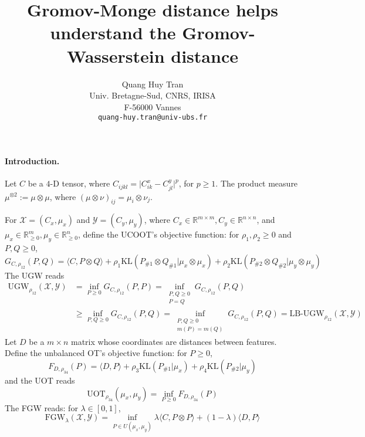 \documentclass{article}
\title{Gromov-Monge distance helps understand the Gromov-Wasserstein distance}
\author{
  Quang Huy Tran \\
  Univ. Bretagne-Sud, CNRS, IRISA \\
  F-56000 Vannes \\
  \texttt{quang-huy.tran@univ-ubs.fr}
}
\theoremstyle{remark}
\begin{document}
\maketitle

\paragraph{Introduction.} Let $C$ be a $4$-D tensor, where $C_{ijkl} = \vert C^x_{ik} - C^y_{jl} \vert^p$, for $p \geq 1$. The product measure $\mu^{\otimes 2} := \mu \otimes \mu$, where $(\mu \otimes \nu)_{ij} = \mu_i \otimes \nu_j$.

For $\mathcal X = (C_x, \mu_x)$ and $\mathcal Y = (C_y, \mu_y)$, where $C_x \in \mathbb R^{m \times m}, C_y \in \mathbb R^{n \times n}$, and $\mu_x \in \mathbb R^{m}_{\geq 0}, \mu_y \in \mathbb R^{n}_{\geq 0}$,
define the UCOOT's objective function: for $\rho_1, \rho_2 \geq 0$ and $P,Q \geq 0$,
\begin{equation}
    G_{C, \rho_{12}}(P,Q) = \langle C, P \otimes Q \rangle + \rho_1 \text{KL}(P_{\# 1} \otimes Q_{\# 1} \vert \mu_x \otimes \mu_x) + \rho_2 \text{KL}(P_{\# 2} \otimes Q_{\# 2} \vert \mu_y \otimes \mu_y)
\end{equation}
The UGW reads
\begin{equation*}
    \begin{split}
     \text{UGW}_{\rho_{12}}(\mathcal X, \mathcal Y) &= \inf_{P \geq 0} G_{C,\rho_{12}}(P, P) = \inf_{\substack{P, Q \geq 0 \\ P = Q}} G_{C,\rho_{12}}(P, Q) \\
        &\geq \inf_{P,Q \geq 0} G_{C,\rho_{12}}(P, Q) = \inf_{\substack{P, Q \geq 0 \\ m(P) = m(Q)}} G_{C,\rho_{12}}(P, Q) =  \text{LB-UGW}_{\rho_{12}}(\mathcal X, \mathcal Y)
    \end{split}
\end{equation*}
Let $D$ be a $m \times n$ matrix whose coordinates are distances between features. Define the unbalanced OT's objective function: for $P \geq 0$,
\begin{equation}
    F_{D, \rho_{34}}(P) = \langle D, P \rangle + \rho_3 \text{KL}(P_{\# 1} \vert \mu_x) + \rho_4 \text{KL}(P_{\# 2} \vert \mu_y)
\end{equation}
and the UOT reads
\begin{equation*}
    \text{UOT}_{\rho_{34}}(\mu_x,\mu_y) = \inf_{P \geq 0} F_{D, \rho_{34}}(P)
\end{equation*}
The FGW reads: for $\lambda \in [0,1]$,
\begin{equation*}
    \text{FGW}_{\lambda}(\mathcal X, \mathcal Y) = \inf_{P \in U(\mu_x, \mu_y)} \lambda \langle C, P \otimes P \rangle + (1 - \lambda) \langle D, P \rangle
\end{equation*}
\end{document}
